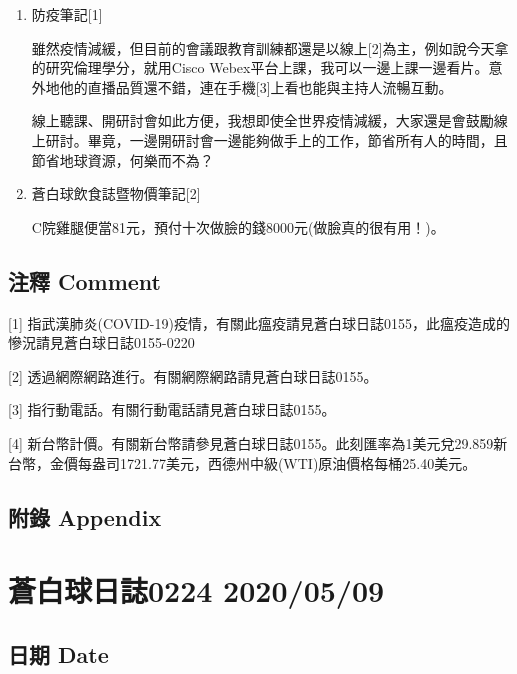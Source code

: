 \documentclass[a5paper, 11pt
]{book}
\begin{document}
\begin{enumerate}
\def\labelenumi{\arabic{enumi}.}
\item
  防疫筆記{[}1{]}

  雖然疫情減緩，但目前的會議跟教育訓練都還是以線上{[}2{]}為主，例如說今天拿的研究倫理學分，就用Cisco
  Webex平台上課，我可以一邊上課一邊看片。意外地他的直播品質還不錯，連在手機{[}3{]}上看也能與主持人流暢互動。

  線上聽課、開研討會如此方便，我想即使全世界疫情減緩，大家還是會鼓勵線上研討。畢竟，一邊開研討會一邊能夠做手上的工作，節省所有人的時間，且節省地球資源，何樂而不為？
\item
  蒼白球飲食誌暨物價筆記{[}2{]}

  C院雞腿便當81元，預付十次做臉的錢8000元(做臉真的很有用！)。
\end{enumerate}

\hypertarget{ux6ce8ux91cb-comment-68}{%
\subsection{注釋 Comment}\label{ux6ce8ux91cb-comment-68}}

{[}1{]}
指武漢肺炎(COVID-19)疫情，有關此瘟疫請見蒼白球日誌0155，此瘟疫造成的慘況請見蒼白球日誌0155-0220

{[}2{]} 透過網際網路進行。有關網際網路請見蒼白球日誌0155。

{[}3{]} 指行動電話。有關行動電話請見蒼白球日誌0155。

{[}4{]}
新台幣計價。有關新台幣請參見蒼白球日誌0155。此刻匯率為1美元兌29.859新台幣，金價每盎司1721.77美元，西德州中級(WTI)原油價格每桶25.40美元。

\hypertarget{ux9644ux9304-appendix-68}{%
\subsection{附錄 Appendix}\label{ux9644ux9304-appendix-68}}

\hypertarget{ux84bcux767dux7403ux65e5ux8a8c0224-20200509}{%
\section{蒼白球日誌0224
2020/05/09}\label{ux84bcux767dux7403ux65e5ux8a8c0224-20200509}}

\hypertarget{ux65e5ux671f-date-69}{%
\subsection{日期 Date}\label{ux65e5ux671f-date-69}}
\end{document}
